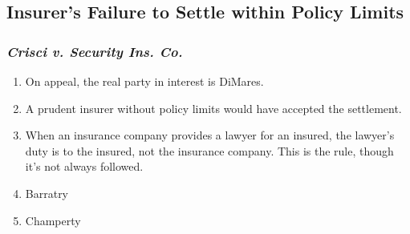 \subsection{Insurer's Failure to Settle within Policy Limits}

\subsubsection{\emph{Crisci v. Security Ins. Co.}}

\begin{enumerate}
    \item On appeal, the real party in interest is DiMares.
    \item A prudent insurer without policy limits would have accepted the 
    settlement.
    \item When an insurance company provides a lawyer for an insured, the 
    lawyer's duty is to the insured, not the insurance company. This is the 
    rule, though it's not always followed.
    \item Barratry
    \item Champerty
\end{enumerate}
